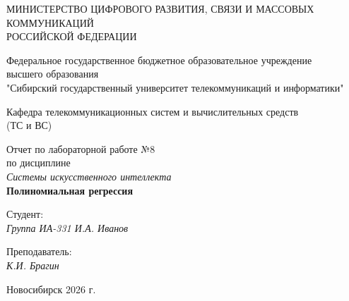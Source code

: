 \thispagestyle{empty}

\begin{center}
    МИНИСТЕРСТВО ЦИФРОВОГО РАЗВИТИЯ, СВЯЗИ И МАССОВЫХ КОММУНИКАЦИЙ \\
    РОССИЙСКОЙ ФЕДЕРАЦИИ
    
    \vspace{20pt}
    
    Федеральное государственное бюджетное образовательное учреждение \\
    высшего образования \\
    "Сибирский государственный университет телекоммуникаций и информатики" \\
    
    \vspace{20pt}
    
    Кафедра телекоммуникационных систем и вычислительных средств \\
    (ТС и ВС)
\end{center}

\vfill

\begin{center}
    Отчет по лабораторной работе №8 \\
    по дисциплине \\
    \textit{Системы искусственного интеллекта} \\
    \vspace{10pt}
    \textbf{Полиномиальная регрессия}
    \vspace{20pt}
\end{center}

\vfill

\noindent Студент: \\
\textit{Группа ИА-331 \hfill И.А. Иванов}

\vspace{20pt}

\noindent Преподаватель: \\
\textit{\hfill К.И. Брагин}

\vfill

\begin{center}
    Новосибирск 2026 г.
\end{center}
\endinput